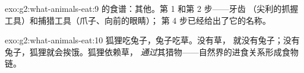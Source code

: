 \begin{solution}{exo:g2:what-animals-eat:9}
的食谱：其他。第 1 和第 2 步——牙齿
（尖利的抓握工具）和捕猎工具（爪子、向前的眼睛）；
第 4 步已经给出了它的名称。
\end{solution}

\begin{solution}{exo:g2:what-animals-eat:10}
狐狸吃兔子，兔子吃草。没有草，
就没有兔子；没有兔子，狐狸就会挨饿。狐狸依赖草，
\emph{通过}其猎物——自然界的进食关系形成食物链。
\end{solution}
